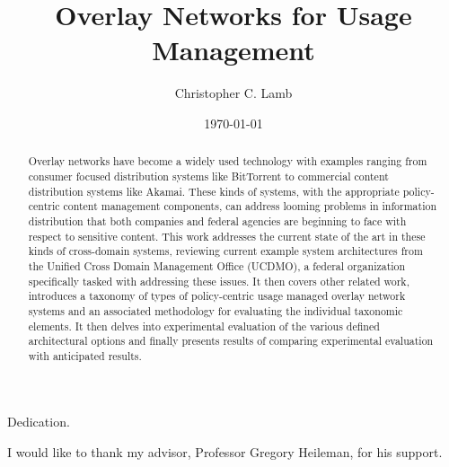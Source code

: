 \documentclass[botnum,fleqn,final]{unmeethesis}
\newcommand{\mytitle}{Overlay Networks for Usage Management}
\newcommand{\myauthor}{Christopher C. Lamb}
\begin{document}
\frontmatter

\title{\mytitle}
\author{\myauthor}





\date{\today}

\maketitle

\makecopyright

\begin{dedication}
   Dedication.
\end{dedication}

\begin{acknowledgments}
   \vspace{1.1in}
   I would like to thank my advisor, Professor Gregory Heileman, for his support.
\end{acknowledgments}

\maketitleabstract

\begin{abstract}
Overlay networks have become a widely used technology with examples ranging from consumer focused distribution systems like BitTorrent to commercial content distribution systems like Akamai.  These kinds of systems, with the appropriate policy-centric content management components, can address looming problems in information distribution that both companies and federal agencies are beginning to face with respect to sensitive content.  This work addresses the current state of the art in these kinds of cross-domain systems, reviewing current example system architectures from the Unified Cross Domain Management Office (UCDMO), a federal organization specifically tasked with addressing these issues.  It then covers other related work, introduces a taxonomy of types of policy-centric usage managed overlay network systems and an associated methodology for evaluating the individual taxonomic elements.  It then delves into experimental evaluation of the various defined architectural options and finally presents results of comparing experimental evaluation with anticipated results. 
\end{abstract}
\end{document}
